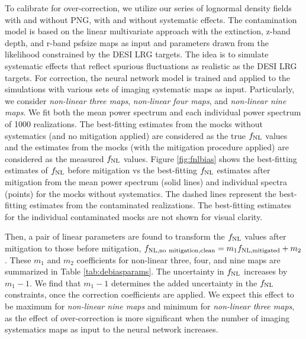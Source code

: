To calibrate for over-correction, we utilize our series of lognormal density fields with and without PNG, with and without systematic effects. The contamination model is based on the linear multivariate approach with the extinction, z-band depth, and r-band psfsize maps as input and parameters drawn from the likelihood constrained by the DESI LRG targets. The idea is to simulate systematic effects that reflect spurious fluctuations as  realistic as the DESI LRG targets. For correction, the neural network model is trained and applied to the simulations with various sets of imaging systematic maps as input. Particularly, we consider \textit{non-linear three maps}, \textit{non-linear four maps}, and \textit{non-linear nine maps}. We fit both the mean power spectrum and each individual power spectrum of 1000 realizations. The best-fitting estimates from the mocks without systematics (and no mitigation applied) are considered as the true $f_{\rm NL}$ values and the estimates from the mocks (with the mitigation procedure applied) are considered as the measured $f_{\rm NL}$ values. Figure \ref{fig:fnlbias} shows the best-fitting estimates of $f_{\rm NL}$ before mitigation vs the best-fitting $f_{\rm NL}$ estimates after mitigation from the mean power spectrum (solid lines) and individual spectra (points) for the mocks without systematics. The dashed lines represent the best-fitting estimates from the contaminated realizations. The best-fitting estimates for the individual contaminated mocks are not shown for visual clarity. 

Then, a pair of linear parameters are found to transform the $f_{\rm NL}$ values after mitigation to those before mitigation, $f_{\rm NL, no~mitigation, clean} = m_{1} f_{\rm NL, mitigated} + m_{2}$. These $m_{1}$ and $m_{2}$ coefficients for non-linear three, four, and nine maps are summarized in Table \ref{tab:debiasparams}. The uncertainty in $f_{\rm NL}$ increases by $m_{1}-1$. We find that $m_{1}-1$ determines the added uncertainty in the $f_{\rm NL}$ constraints, once the correction coefficients are applied. We expect this effect to be maximum for \textit{non-linear nine maps} and minimum for \textit{non-linear three maps}, as the effect of over-correction is more significant when the number of imaging systematics maps as input to the neural network increases. 

 